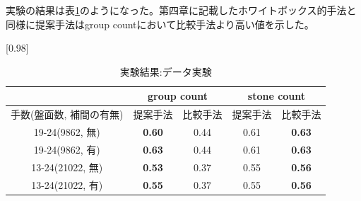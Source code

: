実験の結果は表\ref{table:result-offline}のようになった。第四章に記載したホワイトボックス的手法と同様に提案手法はgroup countにおいて比較手法より高い値を示した。
\begin{table}[H]
	\caption{実験結果:データ実験}
	\centering
	\scalebox{0.98}[0.98]{
		\begin{tabular}{c|c|c|c|c}
			\multicolumn{1}{c}{} & \multicolumn{2}{|c|}{group count} 
			& \multicolumn{2}{c|}{stone count}\\ \hline \hline
			手数(盤面数, 補間の有無)    & 提案手法 & 比較手法 & 提案手法 & 比較手法 \\ \hline
			19-24(9862, 無)    & \bf{0.60} & 0.44 & 0.61 & \bf{0.63} \\
			19-24(9862, 有)    & \bf{0.63} & 0.44 & 0.61 & \bf{0.63}  \\
			13-24(21022, 無)   & \bf{0.53} & 0.37 & 0.55 & \bf{0.56}  \\
			13-24(21022, 有)   & \bf{0.55} & 0.37 & 0.55 & \bf{0.56}  \\
		\end{tabular}
	}
	\label{table:result-offline}
\end{table}
